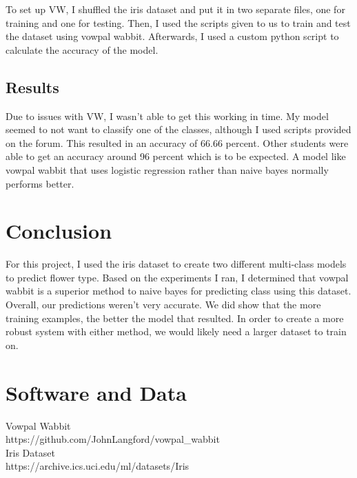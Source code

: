 \documentclass{article}
\begin{document}
To set up VW, I shuffled the iris dataset and put it in two separate files, one for training and one for testing. Then, I used the scripts given to us to train and test the dataset using vowpal wabbit. Afterwards, I used a custom python script to calculate the accuracy of the model.


\subsection{Results}

Due to issues with VW, I wasn't able to get this working in time. My model seemed to not want to classify one of the classes, although I used scripts provided on the forum. This resulted in an accuracy of 66.66 percent. Other students were able to get an accuracy around 96 percent which is to be expected. A model like vowpal wabbit that uses logistic regression rather than naive bayes normally performs better.

\section{Conclusion}

For this project, I used the iris dataset to create two different multi-class models to predict flower type. Based on the experiments I ran, I determined that vowpal wabbit is a superior method to naive bayes for predicting class using this dataset. Overall, our predictions weren't very accurate. We did show that the more training examples, the better the model that resulted. In order to create a more robust system with either method, we would likely need a larger dataset to train on. 


\section{Software and Data}

Vowpal Wabbit\\ https://github.com/JohnLangford/vowpal_wabbit\\
Iris Dataset\\ https://archive.ics.uci.edu/ml/datasets/Iris\\


\nocite{langley00}
\end{document}
